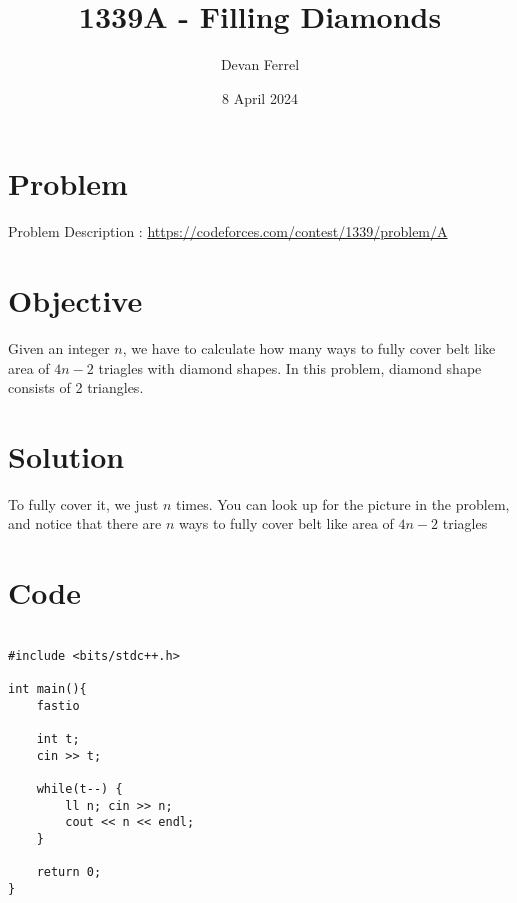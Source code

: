 \documentclass{article}
\title{1339A - Filling Diamonds}
\author{Devan Ferrel}
\date{8 April 2024}
\begin{document}
\maketitle


\section{Problem}

Problem Description : \href{https://codeforces.com/contest/1339/problem/A}{https://codeforces.com/contest/1339/problem/A}

\section{Objective}

Given an integer $n$, we have to calculate how many ways to fully cover belt like area of $4n - 2$ triagles with diamond shapes. In this problem, diamond shape consists of 2 triangles.

\section{Solution}

To fully cover it, we just $n$ times. You can look up for the picture in the problem, and notice that there are $n$ ways to fully cover belt like area of $4n - 2$ triagles

\newpage
\section{Code}


\begin{lstlisting}

#include <bits/stdc++.h>

int main(){
    fastio

    int t;
    cin >> t;

    while(t--) {
        ll n; cin >> n;
        cout << n << endl;
    }

    return 0;
}

\end{lstlisting}
\end{document}

